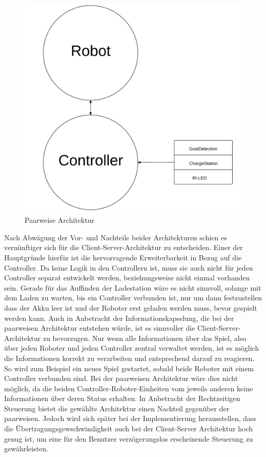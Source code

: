 \begin{figure}[h!]
	\includegraphics[scale=0.25]{images/paarweise_architektur.pdf}
	\caption{Paarweise Architektur}
	\label{fig:paarweise_architektur}
\end{figure}


Nach Abwägung der Vor- und Nachteile beider Architekturen schien es vernünftiger sich für die Client-Server-Architektur zu entscheiden. Einer der Hauptgründe hierfür ist die hervorragende Erweiterbarkeit in Bezug auf die Controller. Da keine Logik in den Controllern ist, muss sie auch nicht für jeden Controller separat entwickelt werden, beziehungsweise nicht einmal vorhanden sein. Gerade für das Auffinden der Ladestation wäre es nicht sinnvoll, solange mit dem Laden zu warten, bis ein Controller verbunden ist, nur um dann festzustellen dass der Akku leer ist und der Roboter erst geladen werden muss, bevor gespielt werden kann. Auch in Anbetracht der Informationskapselung, die bei der paarweisen Architektur entstehen würde, ist es sinnvoller die Client-Server-Architektur zu bevorzugen. Nur wenn alle Informationen über das Spiel, also über jeden Roboter und jeden Controller zentral verwaltet werden, ist es möglich die Informationen korrekt zu verarbeiten und entsprechend darauf zu reagieren. So wird zum Beispiel ein neues Spiel gestartet, sobald beide Roboter mit einem Controller verbunden sind. Bei der paarweisen Architektur wäre dies nicht möglich, da die beiden Controller-Roboter-Einheiten vom jeweils anderen keine Informationen über deren Status erhalten. In Anbetracht der Rechtzeitigen Steuerung bietet die gewählte Architektur einen Nachteil gegenüber der paarweisen. Jedoch wird sich später bei der Implementierung herausstellen, dass die Übertragungsgewschwindigkeit auch bei der Client-Server Architektur hoch genug ist, um eine für den Benutzer verzögerungslos erscheinende Steuerung zu gewährleisten.